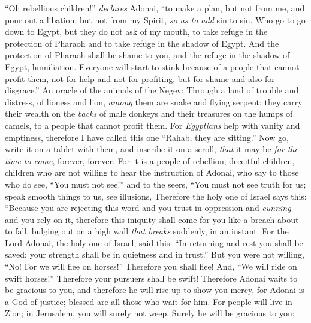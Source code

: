\begin{biblechapter} %
 “Oh rebellious children!” \textit{declares} Adonai,
\verse “to make a plan, but not from me, 
and pour out a libation, but not from my Spirit, 
\textit{so as to add} sin to sin.
\verse Who go to go down to Egypt, 
but they do not ask of my mouth, 
to take refuge in the protection of Pharaoh 
and to take refuge in the shadow of Egypt.
\verse And the protection of Pharaoh shall be shame to you, 
and the refuge in the shadow of Egypt, humiliation.
\verse Everyone will start to stink because of a people that cannot profit them, not for help and not for profiting, 
but for shame and also for disgrace.”
 An oracle of the animals of the Negev:
\verse Through a land of trouble and distress, 
of lioness and lion, 
\textit{among} them are snake and flying serpent; 
they carry their wealth on the \textit{backs} of male donkeys 
and their treasures on the humps of camels, 
to a people that cannot profit them.
\verse For \textit{Egyptians} help with vanity and emptiness, 
therefore I have called this one “Rahab, they are sitting.”
\verse Now go, write it on a tablet with them, 
and inscribe it on a scroll, 
\textit{that} it may be \textit{for the time to come}, 
forever, forever.
\verse For it is a people of rebellion, deceitful children, 
children who are not willing to hear the instruction of Adonai,
\verse who say to those who do see, “You must not see!” 
and to the seers, “You must not see truth for us; 
speak smooth things to us, 
see illusions,
\verse Therefore the holy one of Israel says this:
\verse “Because you are rejecting this word 
and you trust in oppression and \textit{cunning} 
and you rely on it,
\verse therefore this iniquity shall come for you like a breach about to fall, 
bulging out on a high wall \textit{that breaks} suddenly, in an instant.
\verse For the Lord Adonai, the holy one of Israel, said this: “In returning and rest you shall be saved; 
your strength shall be in quietness and in trust.”
\verse But you were not willing,
\verse “No! For we will flee on horses!” Therefore you shall flee! 
And, “We will ride on swift horses!” Therefore your pursuers shall be swift!
 Therefore Adonai waits to be gracious to you, 
and therefore he will rise up to show you mercy, 
for Adonai is a God of justice; 
blessed are all those who wait for him.
\verse For people will live in Zion; 
in Jerusalem, you will surely not weep. 
Surely he will be gracious to you; 

\end{biblechapter}
